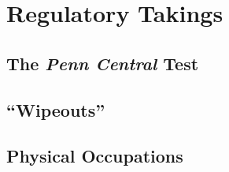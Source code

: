 \chapter{Regulatory Takings}






\section{The \emph{Penn Central} Test}



\begin{questions}

\end{questions}


\section{``Wipeouts''}




\begin{questions}

\end{questions}




\section{Physical Occupations}





\begin{questions}

\end{questions}



